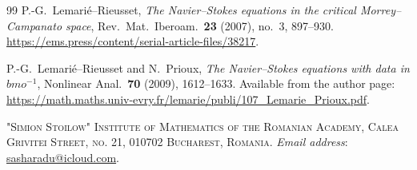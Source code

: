 \documentclass[12pt]{article}
\theoremstyle{remark}
\theoremstyle{remark}
\begin{document}
\begin{thebibliography}{99}
P.-G.~Lemari\'e--Rieusset,
\newblock \emph{The Navier--Stokes equations in the critical Morrey--Campanato space},
\newblock Rev.\ Mat.\ Iberoam.\ \textbf{23} (2007), no.~3, 897--930.
\newblock \url{https://ems.press/content/serial-article-files/38217}.

P.-G.~Lemari\'e--Rieusset and N.~Prioux,
\newblock \emph{The Navier--Stokes equations with data in $bmo^{-1}$},
\newblock Nonlinear Anal.\ \textbf{70} (2009), 1612--1633.
\newblock Available from the author page:
\url{https://math.maths.univ-evry.fr/lemarie/publi/107_Lemarie_Prioux.pdf}.

\end{thebibliography}

\noindent\textsc{"Simion Stoilow" Institute of Mathematics of the Romanian Academy, Calea Grivitei Street, no. 21, 010702 Bucharest, Romania.}
\newline\noindent\textit{Email address}: \href{mailto:sasharadu@icloud.com}{sasharadu@icloud.com}.
\end{document}
